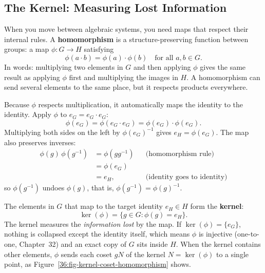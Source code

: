 \subsection{The Kernel: Measuring Lost Information}

When you move between algebraic systems, you need maps that respect their internal rules. A \textbf{homomorphism} is a structure-preserving function between groups: a map $\phi \colon G \to H$ satisfying
\[
\phi(a \cdot b) = \phi(a) \cdot \phi(b) \quad \text{for all } a, b \in G.
\]
In words: multiplying two elements in $G$ and then applying $\phi$ gives the same result as applying $\phi$ first and multiplying the images in $H$. A homomorphism can send several elements to the same place, but it respects products everywhere.

Because $\phi$ respects multiplication, it automatically maps the identity to the identity. Apply $\phi$ to $e_G = e_G \cdot e_G$:
\[
\phi(e_G) = \phi(e_G \cdot e_G) = \phi(e_G) \cdot \phi(e_G).
\]
Multiplying both sides on the left by $\phi(e_G)^{-1}$ gives $e_H = \phi(e_G)$. The map also preserves inverses:
\begin{align*}
\phi(g)\,\phi(g^{-1}) &= \phi(gg^{-1}) && \text{(homomorphism rule)}\\
&= \phi(e_G)\\
&= e_H, && \text{(identity goes to identity)}
\end{align*}
so $\phi(g^{-1})$ undoes $\phi(g)$, that is, $\phi(g^{-1}) = \phi(g)^{-1}$.

The elements in $G$ that map to the target identity $e_H \in H$ form the \textbf{kernel}:
\[
\ker(\phi) = \{g \in G : \phi(g) = e_H\}.
\]
The kernel measures the \emph{information lost} by the map. If $\ker(\phi) = \{e_G\}$, nothing is collapsed except the identity itself, which means $\phi$ is injective (one-to-one, Chapter~32) and an exact copy of $G$ sits inside $H$. When the kernel contains other elements, $\phi$ sends each coset $gN$ of the kernel $N = \ker(\phi)$ to a single point, as Figure~\ref{36:fig-kernel-coset-homomorphism} shows.

